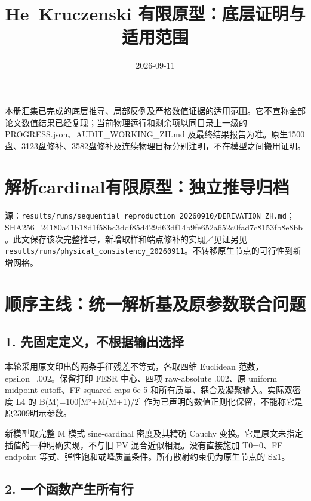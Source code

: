 \documentclass[
  10pt,
  a4paper,
]{article}
\title{He--Kruczenski 有限原型：底层证明与适用范围}
\author{}
\date{2026-09-11}
\begin{document}
\maketitle

{
\setcounter{tocdepth}{2}
\tableofcontents
}
本册汇集已完成的底层推导、局部反例及严格数值证据的适用范围。它不宣称全部论文数值结果已经复现；当前物理运行和剩余项以同目录上一级的
PROGRESS.json、AUDIT\_WORKING\_ZH.md
及最终结果报告为准。原生1500盘、3123盘修补、3582盘修补及连续物理目标分别注明，不在模型之间搬用证明。

\newpage

\section{解析cardinal有限原型：独立推导归档}\label{ux89e3ux6790cardinalux6709ux9650ux539fux578bux72ecux7acbux63a8ux5bfcux5f52ux6863}

源：\texttt{results/runs/sequential\_reproduction\_20260910/DERIVATION\_ZH.md}；SHA256=24180a41b18d1f58bc3ddf85d429d63df14b9fe652a652c0fad7c8153fb8e8bb。此文保存该次完整推导，新增取样和端点修补的实现／见证另见\texttt{results/runs/physical\_consistency\_20260911}。不转移原生节点的可行性到新增网格。

\section{顺序主线：统一解析基及原参数联合问题}\label{ux987aux5e8fux4e3bux7ebfux7edfux4e00ux89e3ux6790ux57faux53caux539fux53c2ux6570ux8054ux5408ux95eeux9898}

\subsection{1.
先固定定义，不根据输出选择}\label{ux5148ux56faux5b9aux5b9aux4e49ux4e0dux6839ux636eux8f93ux51faux9009ux62e9}

本轮采用原文印出的两条手征残差不等式，各取四维 Euclidean
范数，epsilon=.002。保留打印 FESR 中心、四项 raw-absolute .002、原
uniform midpoint cutoff、FF squared caps 6e-5
和所有质量、耦合及凝聚输入。实际双密度 L4 的 B(M)=100{[}M²+M(M+1)/2{]}
作为已声明的数值正则化保留，不能称它是原2309明示参数。

新模型取完整 M 模式 sine-cardinal 密度及其精确 Cauchy
变换。它是原文未指定插值的一种明确实现，不与旧 PV
混合近似相混。没有直接施加 T0=0、FF endpoint
等式、弹性饱和或峰质量条件。所有散射约束仍为原生节点的
\textbar S\textbar≤1。

\subsection{2.
一个函数产生所有行}\label{ux4e00ux4e2aux51fdux6570ux4ea7ux751fux6240ux6709ux884c}
\end{document}
